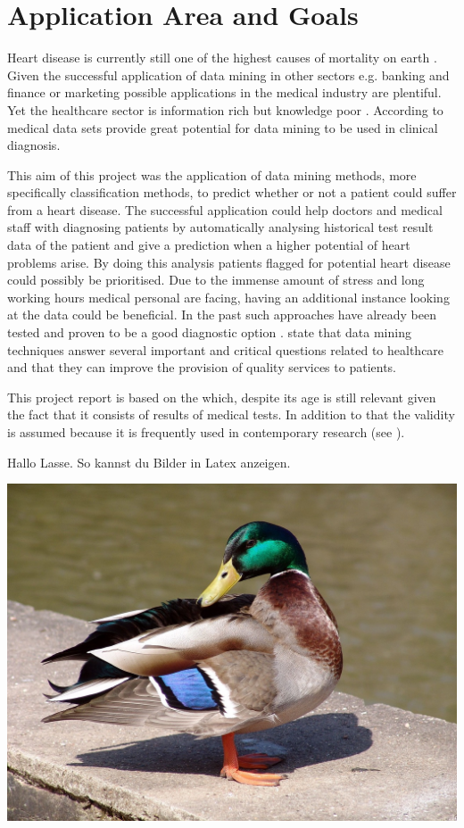 \section{Application Area and Goals}

Heart disease is currently still one of the highest causes of mortality on earth \citep{nahar2013, kavitha2016, statistischesbundesamt2020}.
Given the successful application of data mining in other sectors e.g. banking and finance or marketing \citep{keles2017} possible applications in the medical industry are plentiful. Yet the healthcare sector is information rich but knowledge poor \citep{soni2011}. According to \citet{soni2011} medical data sets provide great potential for data mining to be used in clinical diagnosis.


This aim of this project was the application of data mining methods, more specifically classification methods, to predict whether or not a patient could suffer from a heart disease. The successful application could help doctors and medical staff with diagnosing patients by automatically analysing historical test result data of the patient and give a prediction when a higher potential of heart problems arise. By doing this analysis patients flagged for potential heart disease could possibly be prioritised. Due to the immense amount of stress and long working hours medical personal are facing, having an additional instance looking at the data could be beneficial. 
In the past such approaches have already been tested and proven to be a good diagnostic option \citep{usharani2011}. \citet{jabbar2013} state that data mining techniques answer several important and critical questions related to healthcare and that they can improve the provision of quality services to patients.

This project report is based on the  \citep{janosi1988} which, despite its age is still relevant given the fact that it consists of results of medical tests. In addition to that the validity is assumed because it is frequently used in contemporary research (see \cite{usharani2011, aha1988, nahar2013}).


\newpage

Hallo Lasse. So kannst du Bilder in Latex anzeigen.

\includegraphics[width=\textwidth]{images/duck.jpg}


